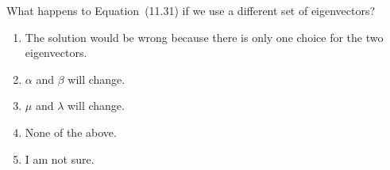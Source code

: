 \documentclass[t, 14pt]{beamer}
\begin{document}
\begin{frame}
  What happens to Equation~(11.31) if we use a different set of eigenvectors?

  \begin{enumerate}
    \item The solution would be wrong because there is only one choice for the two eigenvectors.
    \item \(\alpha\) and \(\beta\) will change.
    \item \(\mu\) and \(\lambda\) will change.
    \item None of the above.
    \item I am not sure.
  \end{enumerate}
\end{frame}
\end{document}

